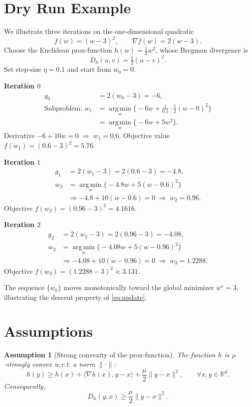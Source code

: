 \documentclass{article}
\newtheorem{assumption}{Assumption}
\newcommand{\argmin}{\operatorname*{arg\,min}}
\newcommand{\grad}{\nabla}
\newcommand{\D}[2]{D_h(#1,#2)}
\begin{document}
\section*{Dry Run Example}
We illustrate three iterations on the one‑dimensional quadratic
\[
f(w)=(w-3)^2,
\qquad \grad f(w)=2(w-3).
\]
Choose the Euclidean prox‑function $h(w)=\tfrac12 w^2$, whose Bregman divergence is
\[
\D{u}{v}= \tfrac12 (u-v)^2 .
\]
Set step‑size $\eta=0.1$ and start from $w_0=0$.

\bigskip
\noindent\textbf{Iteration $0$}
\begin{align*}
g_0 &= 2(w_0-3) = -6,\\
\text{Subproblem: } 
w_1 &= \argmin_{w}\Big\{-6w+\frac{1}{0.1}\cdot\tfrac12 (w-0)^2\Big\}\\
    &= \argmin_{w}\Big\{-6w+5 w^2\Big\}.
\end{align*}
Derivative $-6+10w=0\;\Rightarrow\; w_1=0.6$.
Objective value $f(w_1)=(0.6-3)^2=5.76$.

\bigskip
\noindent\textbf{Iteration $1$}
\begin{align*}
g_1 &= 2(w_1-3)=2(0.6-3)=-4.8,\\
w_2 &= \argmin_{w}\Big\{-4.8 w+5 (w-0.6)^2\Big\}\\
    &\Longrightarrow -4.8+10(w-0.6)=0
    \;\Rightarrow\; w_2=0.96 .
\end{align*}
Objective $f(w_2)=(0.96-3)^2=4.1616$.

\bigskip
\noindent\textbf{Iteration $2$}
\begin{align*}
g_2 &= 2(w_2-3)=2(0.96-3)=-4.08,\\
w_3 &= \argmin_{w}\Big\{-4.08 w+5 (w-0.96)^2\Big\}\\
    &\Longrightarrow -4.08+10(w-0.96)=0
    \;\Rightarrow\; w_3=1.2288 .
\end{align*}
Objective $f(w_3)=(1.2288-3)^2\approx 3.131$.

The sequence $\{w_k\}$ moves monotonically toward the global minimizer $w^\star=3$, illustrating the descent property of \eqref{eq:update}.

\section*{Assumptions}
\begin{assumption}[Strong convexity of the prox‑function]
\label{as:h}
The function $h$ is $\mu$‑strongly convex w.r.t. a norm $\|\cdot\|$:
\[
h(y)\ge h(x)+\langle\grad h(x),y-x\rangle+\frac{\mu}{2}\|y-x\|^{2},
\qquad\forall x,y\in\mathbb{R}^d .
\]
Consequently,
\[
\D{y}{x}\ge \frac{\mu}{2}\|y-x\|^{2}.
\tag{A1}
\]
\end{assumption}
\end{document}
